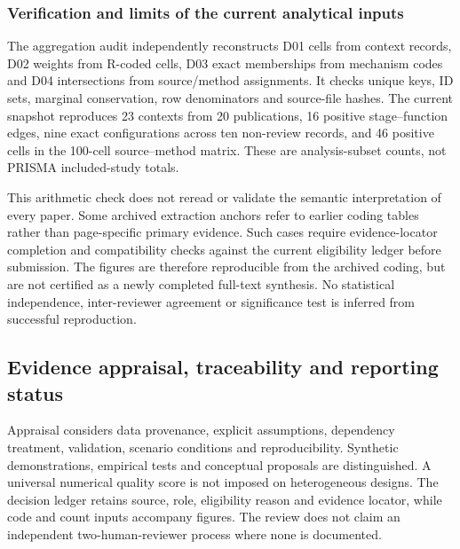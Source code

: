 \subsubsection{Verification and limits of the current analytical inputs}

The aggregation audit independently reconstructs D01 cells from context records, D02 weights from R-coded cells, D03 exact memberships from mechanism codes and D04 intersections from source/method assignments. It checks unique keys, ID sets, marginal conservation, row denominators and source-file hashes. The current snapshot reproduces 23 contexts from 20 publications, 16 positive stage--function edges, nine exact configurations across ten non-review records, and 46 positive cells in the 100-cell source--method matrix. These are analysis-subset counts, not PRISMA included-study totals.

This arithmetic check does not reread or validate the semantic interpretation of every paper. Some archived extraction anchors refer to earlier coding tables rather than page-specific primary evidence. Such cases require evidence-locator completion and compatibility checks against the current eligibility ledger before submission. The figures are therefore reproducible from the archived coding, but are not certified as a newly completed full-text synthesis. No statistical independence, inter-reviewer agreement or significance test is inferred from successful reproduction.

\subsection{Evidence appraisal, traceability and reporting status}

Appraisal considers data provenance, explicit assumptions, dependency treatment, validation, scenario conditions and reproducibility. Synthetic demonstrations, empirical tests and conceptual proposals are distinguished. A universal numerical quality score is not imposed on heterogeneous designs. The decision ledger retains source, role, eligibility reason and evidence locator, while code and count inputs accompany figures. The review does not claim an independent two-human-reviewer process where none is documented.

